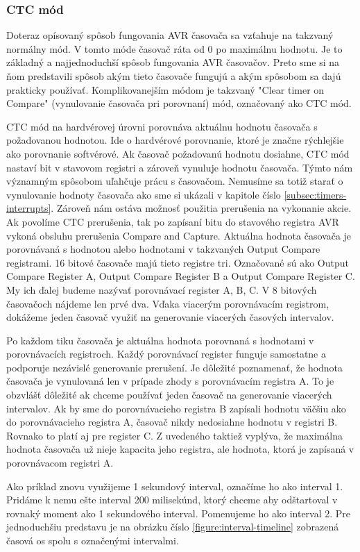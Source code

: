\subsubsection{CTC mód} \label{subsec:ctc-mode}
Doteraz opísovaný spôsob fungovania AVR časovača sa vzťahuje na takzvaný normálny  mód. V tomto móde časovač ráta od 0 po maximálnu hodnotu.
Je to základný a najjednoduchší spôsob fungovania AVR časovačov. Preto sme si na ňom predstavili spôsob akým tieto časovače fungujú a akým spôsobom sa dajú prakticky
používať. Komplikovanejším módom je takzvaný "Clear timer on Compare" (vynulovanie časovača pri porovnaní) mód, označovaný ako CTC mód. \par
CTC mód na hardvérovej úrovni porovnáva aktuálnu hodnotu časovača s požadovanou hodnotou. Ide o hardvérové porovnanie, ktoré je značne rýchlejšie ako porovnanie
softvérové. Ak časovač požadovanú hodnotu dosiahne, CTC mód nastaví bit v stavovom registri
a zároveň vynuluje hodnotu časovača. Týmto nám významným spôsobom uľahčuje prácu s časovačom. Nemusíme sa totiž starať o vynulovanie hodnoty časovača ako sme si ukázali
v kapitole číslo \ref{subsec:timers-interrupts}. Zároveň nám ostáva možnosť použitia prerušenia na vykonanie akcie. Ak povolíme CTC prerušenia, tak po zapísaní bitu
do stavového registra AVR vykoná obsluhu prerušenia Compare and Capture. Aktuálna hodnota časovača je porovnávaná s hodnotou alebo hodnotami v takzvaných Output Compare registrami.
16 bitové časovače majú tieto registre tri. Označované sú ako Output Compare Register A, Output Compare Register B a Output Compare Register C. My ich ďalej budeme nazývať
porovnávací register A, B, C. V 8 bitových časovačoch nájdeme len prvé dva. Vďaka viacerým porovnávacím registrom, dokážeme jeden časovač využiť na generovanie viacerých
časových intervalov. \par
Po každom tiku časovača je aktuálna hodnota  porovnaná s hodnotami v porovnávacích registroch. Každý porovnávací register funguje
samostatne a podporuje nezávislé generovanie prerušení. Je dôležité poznamenať, že hodnota časovača je vynulovaná len v prípade zhody s porovnávacím registra A.
To je obzvlášť dôležité ak chceme používať jeden časovač na generovanie viacerých intervalov. Ak by sme do porovnávacieho registra B zapísali hodnotu väčšiu ako
do porovnávacieho registra A, časovač nikdy nedosiahne hodnotu v registri B. Rovnako to platí aj pre register C. Z uvedeného taktiež vyplýva, že maximálna hodnota
časovača už nieje kapacita jeho registra, ale hodnota, ktorá je zapísaná v porovnávacom registri A. \par
Ako príklad znovu využijeme 1 sekundový interval, označíme ho ako interval 1.
Pridáme k nemu ešte interval 200 milisekúnd, ktorý chceme aby odštartoval v rovnaký moment ako 1 sekundového interval. Pomenujeme ho ako interval 2. Pre jednoduchšiu
predstavu je na obrázku číslo \ref{figure:interval-timeline} zobrazená časová os spolu s označenými intervalmi.



